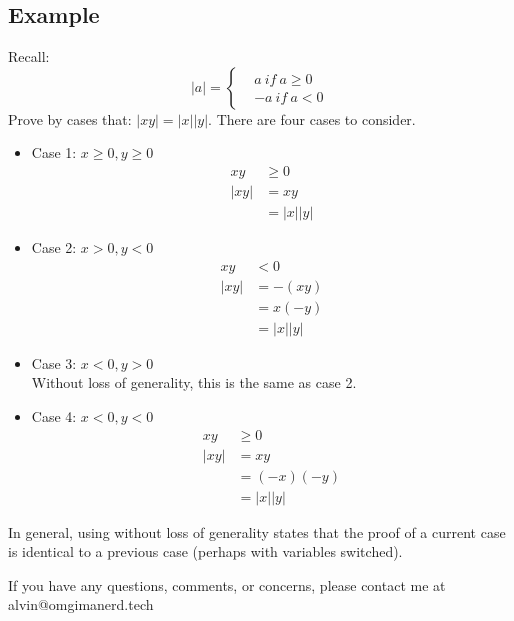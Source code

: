 \documentclass[letterpaper, 12pt]{math}
\begin{document}
\subsection*{Example}
Recall:
\[ |a| =
  \begin{cases}
    & a\ if\ a \geq 0 \\
    &-a\ if\ a < 0
  \end{cases}
\]
Prove by cases that: \( |xy| = |x||y| \). There are four cases to consider.
\begin{itemize}
  \item Case 1: \( x \geq 0, y \geq 0 \)
    \begin{align*}
      xy &\geq 0 \\
      |xy| &= xy \\
      &= |x||y|
    \end{align*}
  \item Case 2: \( x > 0, y < 0 \)
    \begin{align*}
      xy &< 0 \\
      |xy| &= -(xy) \\
      &= x(-y) \\
      &= |x||y|
    \end{align*}
  \item Case 3: \( x < 0, y > 0 \) \\
    Without loss of generality, this is the same as case 2.
  \item Case 4: \( x < 0, y < 0 \)
    \begin{align*}
      xy &\geq 0 \\
      |xy| &= xy \\
      &= (-x)(-y) \\
      &= |x||y|
    \end{align*}
\end{itemize}
In general, using without loss of generality states that the proof of a current
case is identical to a previous case (perhaps with variables switched).

\begin{center}
  If you have any questions, comments, or concerns, please contact me at
  alvin@omgimanerd.tech
\end{center}
\end{document}
